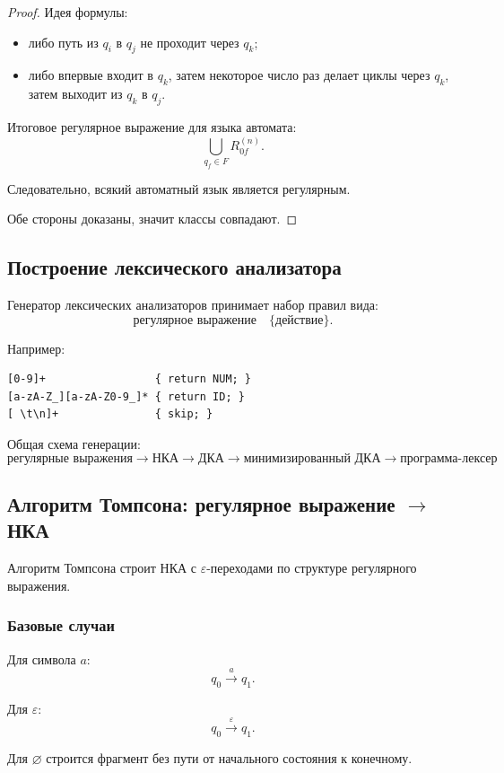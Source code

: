 \documentclass[12pt,a4paper]{article}
\theoremstyle{definition}
\theoremstyle{plain}
\begin{document}
\begin{proof}
Идея формулы:
\begin{itemize}
    \item либо путь из $q_i$ в $q_j$ не проходит через $q_k$;
    \item либо впервые входит в $q_k$, затем некоторое число раз делает циклы через $q_k$, затем выходит из $q_k$ в $q_j$.
\end{itemize}

Итоговое регулярное выражение для языка автомата:
\[
\bigcup_{q_f\in F} R_{0f}^{(n)}.
\]

Следовательно, всякий автоматный язык является регулярным.

Обе стороны доказаны, значит классы совпадают.
\end{proof}

\subsection{Построение лексического анализатора}

Генератор лексических анализаторов принимает набор правил вида:
\[
\text{регулярное выражение} \quad \{ \text{действие} \}.
\]

Например:
\begin{verbatim}
[0-9]+                 { return NUM; }
[a-zA-Z_][a-zA-Z0-9_]* { return ID; }
[ \t\n]+               { skip; }
\end{verbatim}

Общая схема генерации:
\[
\boxed{
\text{регулярные выражения}
\to
\text{НКА}
\to
\text{ДКА}
\to
\text{минимизированный ДКА}
\to
\text{программа-лексер}
}
\]

\subsection{Алгоритм Томпсона: регулярное выражение $\to$ НКА}

Алгоритм Томпсона строит НКА с $\varepsilon$-переходами по структуре регулярного выражения.

\subsubsection*{Базовые случаи}

Для символа $a$:
\[
q_0 \xrightarrow{a} q_1.
\]

Для $\varepsilon$:
\[
q_0 \xrightarrow{\varepsilon} q_1.
\]

Для $\varnothing$ строится фрагмент без пути от начального состояния к конечному.
\end{document}

